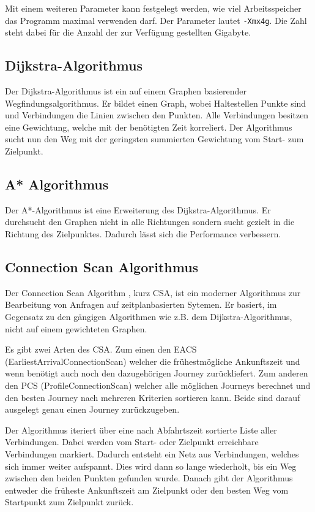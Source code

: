 Mit einem weiteren Parameter kann festgelegt werden, wie viel Arbeitsspeicher das Programm maximal verwenden darf. Der Parameter lautet \texttt{-Xmx4g}. Die Zahl steht dabei für die Anzahl der zur Verfügung gestellten Gigabyte.


\subsection{Dijkstra-Algorithmus}
Der \hypertarget{dij}{Dijkstra-Algorithmus} \cite{dij_bell} ist ein auf einem Graphen basierender Wegfindungsalgorithmus. Er bildet einen Graph, wobei Haltestellen Punkte sind und Verbindungen die Linien zwischen den Punkten. Alle Verbindungen besitzen eine Gewichtung, welche mit der benötigten Zeit korreliert. Der Algorithmus sucht nun den Weg mit der geringsten summierten Gewichtung vom Start- zum Zielpunkt.

\subsection{A* Algorithmus}
Der \hypertarget{A*}{A*-Algorithmus} \cite{dij_a} ist eine Erweiterung des Dijkstra-Algorithmus. Er durchsucht den Graphen nicht in alle Richtungen sondern sucht gezielt in die Richtung des Zielpunktes. Dadurch lässt sich die Performance verbessern.

\subsection{Connection Scan Algorithmus}
Der {\hypertarget{CSA}{Connect}ion Scan Algorithm} \cite{csa} , kurz CSA,  ist ein moderner Algorithmus zur Bearbeitung von Anfragen auf zeitplanbasierten Sytemen. Er basiert, im Gegensatz zu den gängigen Algorithmen wie z.B. dem Dijkstra-Algorithmus, nicht auf einem gewichteten Graphen. \newline

Es gibt zwei Arten des CSA. Zum einen den EACS (EarliestArrivalConnectionScan) welcher die frühestmögliche Ankunftszeit und wenn benötigt auch noch den dazugehörigen Journey zurückliefert. Zum anderen den PCS (ProfileConnectionScan) welcher alle möglichen Journeys berechnet und den besten Journey nach mehreren Kriterien sortieren kann. Beide sind darauf ausgelegt genau einen Journey zurückzugeben. \newline

Der Algorithmus iteriert über eine nach Abfahrtszeit sortierte Liste aller Verbindungen. Dabei werden vom Start- oder Zielpunkt erreichbare Verbindungen markiert. Dadurch entsteht ein Netz aus Verbindungen, welches sich immer weiter aufspannt. Dies wird dann so lange wiederholt, bis ein Weg zwischen den beiden Punkten gefunden wurde. Danach gibt der Algorithmus entweder die früheste Ankunftszeit am Zielpunkt oder den besten Weg vom Startpunkt zum Zielpunkt zurück.




